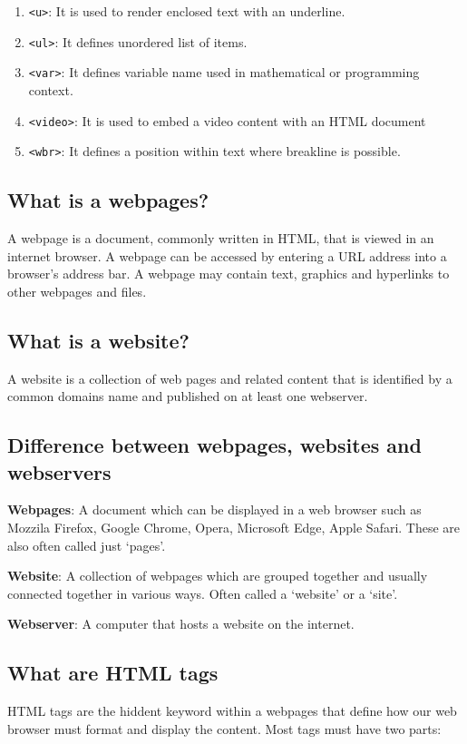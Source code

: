 \documentclass[a4paper]{article}
\begin{document}
\begin{enumerate}
    \item \texttt{<u>}: It is used to render enclosed text with an underline.
    \item \texttt{<ul>}: It defines unordered list of items.

    \item \texttt{<var>}: It defines variable name used in mathematical
      or programming context.
    \item \texttt{<video>}: It is used to embed a video content with an 
      HTML document

    \item \texttt{<wbr>}: It defines a position within text where breakline
      is possible.
  \end{enumerate}%

  \subsection{What is a webpages?}%
  A webpage is a document, commonly written in HTML, that is viewed
  in an internet browser. A webpage can be accessed by entering a URL
  address into a browser's address bar. A webpage may contain text,
  graphics and hyperlinks to other webpages and files.%

  \subsection{What is a website?}%
  A website is a collection of web pages and related content that 
  is identified by a common domains name and published on at least
  one webserver.%

  \subsection{Difference between webpages, websites and webservers}%
  \textbf{Webpages}: A document which can be displayed in a web browser
  such as Mozzila Firefox, Google Chrome, Opera, Microsoft Edge, Apple 
  Safari. These are also often called just `pages'.

  \textbf{Website}: A collection of webpages which are grouped together
  and usually connected together in various ways. Often called a `website'
  or a `site'.

  \textbf{Webserver}: A computer that hosts a website on the internet.%

  \subsection{What are HTML tags}%
  HTML tags are the hiddent keyword within a webpages that define how
  our web browser must format and display the content. Most tags must
  have two parts:
\end{document}
